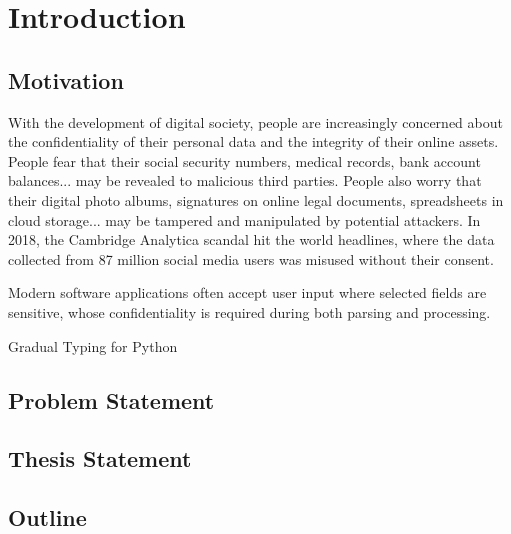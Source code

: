 \chapter{Introduction}

\section{Motivation}

With the development of digital society, people are increasingly
concerned about the confidentiality of their personal data and
the integrity of their online assets. People fear that their
social security numbers, medical records, bank account balances...
may be revealed to malicious third parties. People also worry
that their digital photo albums, signatures on online legal documents,
spreadsheets in cloud storage... may be tampered and manipulated
by potential attackers.
In 2018, the Cambridge Analytica scandal hit the world headlines,
where the data collected from 87 million social media users was misused
without their consent.

Modern software applications often accept user input where
selected fields are sensitive, whose confidentiality is required
during both parsing and processing.

Gradual Typing for Python~\textcite{Vitousek:2014aa}

\section{Problem Statement}

\section{Thesis Statement}


\section{Outline}
